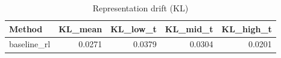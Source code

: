 \begin{table}[htbp]
\centering
\caption{Representation drift (KL)}
\label{tab:repr-drift}
\begin{tabular}{lrrrr}
\toprule
\textbf{Method} & \textbf{KL\_mean} & \textbf{KL\_low\_t} & \textbf{KL\_mid\_t} & \textbf{KL\_high\_t} \\
\midrule
baseline\_rl & 0.0271 & 0.0379 & 0.0304 & 0.0201 \\
\bottomrule
\end{tabular}
\end{table}